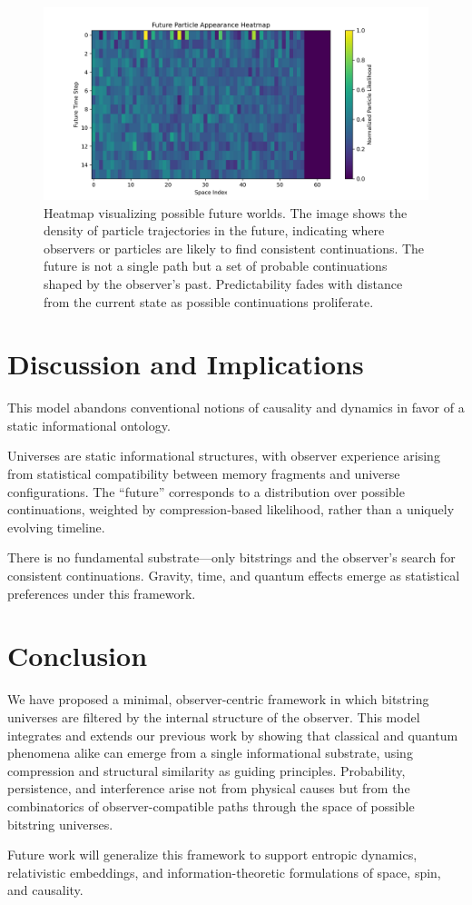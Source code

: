 \documentclass[12pt]{article}
\begin{document}
\begin{figure}[h!]
      \centering
      \includegraphics[width=1.0\textwidth]{figures/future_particle_heatmap.png}
      \caption{Heatmap visualizing possible future worlds. The image shows the density of particle trajectories in the future, indicating where observers or particles are likely to find consistent continuations. The future is not a single path but a set of probable continuations shaped by the observer's past. Predictability fades with distance from the current state as possible continuations proliferate.}
      \label{fig:future_particle_heatmap}
\end{figure}

\section{Discussion and Implications}

This model abandons conventional notions of causality and dynamics in favor of a static informational ontology.

Universes are static informational structures, with observer experience arising from statistical compatibility between memory fragments and universe configurations. The “future” corresponds to a distribution over possible continuations, weighted by compression-based likelihood, rather than a uniquely evolving timeline.

There is no fundamental substrate—only bitstrings and the observer's search for consistent continuations. Gravity, time, and quantum effects emerge as statistical preferences under this framework.


\section{Conclusion}

We have proposed a minimal, observer-centric framework in which bitstring universes are filtered by the internal structure of the observer. This model integrates and extends our previous work by showing that classical and quantum phenomena alike can emerge from a single informational substrate, using compression and structural similarity as guiding principles. Probability, persistence, and interference arise not from physical causes but from the combinatorics of observer-compatible paths through the space of possible bitstring universes.

Future work will generalize this framework to support entropic dynamics, relativistic embeddings, and information-theoretic formulations of space, spin, and causality.
\end{document}
